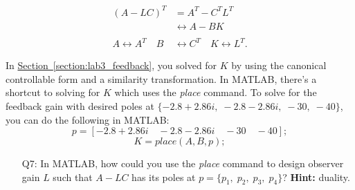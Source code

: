\begin{align*}
    (A-LC)^T                      & = A^T - C^T L^T                                  \\
                                  & \leftrightarrow A - BK                           \\
    \\
    A \leftrightarrow A^T \quad B & \leftrightarrow C^T \quad K \leftrightarrow L^T.
\end{align*}

In \hyperref[section:lab3_feedback]{Section~\ref{section:lab3_feedback}}, you solved for $K$ by using the canonical controllable form and a similarity transformation. In MATLAB, there's a shortcut to solving for $K$ which uses the \emph{place} command. To solve for the feedback gain with desired poles at $\{-2.8 + 2.86i, \; -2.8 - 2.86i, \; -30, \; -40\}$, you can do the following in MATLAB:
\[
    p = [-2.8 + 2.86i \quad -2.8 - 2.86i \quad -30 \quad -40];
\]
\[
    K = place(A,B,p);
\]
\begin{enumerate}
    \item[Q7:] In MATLAB, how could you use the \emph{place} command to design observer gain $L$ such that $A-LC$ has its poles at $p =\{p_1, \; p_2, \; p_3, \; p_4\}$? \textbf{Hint:} duality.
\end{enumerate}

